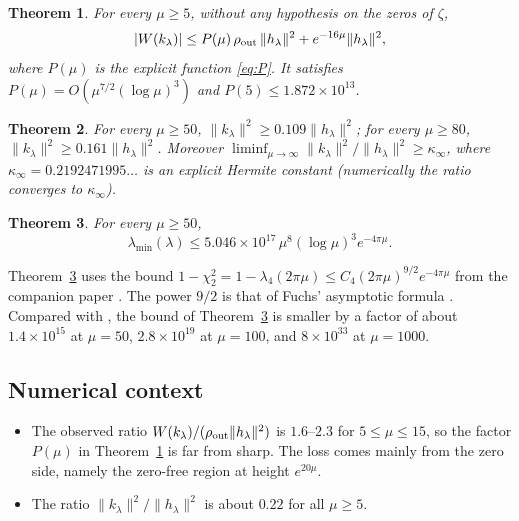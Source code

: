 \documentclass[11pt]{amsart}
\newtheorem{theorem}{Theorem}
\theoremstyle{remark}
\numberwithin{equation}{section}
\begin{document}
\begin{theorem}\label{thm:C}
For every $\mu\ge5$, without any hypothesis on the zeros of $\zeta$,
\[
|W(k_\lambda)|\le P(\mu)\,\rho_{\rm out}\,\|h_\lambda\|^2+e^{-16\mu}\|h_\lambda\|^2,
\]
where $P(\mu)$ is the explicit function \eqref{eq:P}. It satisfies $P(\mu)=O(\mu^{7/2}(\log\mu)^3)$ and $P(5)\le1.872\times10^{13}$.
\end{theorem}

\begin{theorem}\label{thm:L6}
For every $\mu\ge50$, $\|k_\lambda\|^2\ge0.109\|h_\lambda\|^2$; for every $\mu\ge80$, $\|k_\lambda\|^2\ge0.161\|h_\lambda\|^2$. Moreover $\liminf_{\mu\to\infty}\|k_\lambda\|^2/\|h_\lambda\|^2\ge\kappa_\infty$, where $\kappa_\infty=0.2192471995\ldots$ is an explicit Hermite constant (numerically the ratio converges to $\kappa_\infty$).
\end{theorem}

\begin{theorem}\label{thm:E}
For every $\mu\ge50$,
\[
\lambda_{\min}(\lambda)\le5.046\times10^{17}\,\mu^8(\log\mu)^3e^{-4\pi\mu}.
\]
\end{theorem}

Theorem~\ref{thm:E} uses the bound $1-\chi_2^2=1-\lambda_4(2\pi\mu)\le C_4(2\pi\mu)^{9/2}e^{-4\pi\mu}$ from the companion paper \cite{MoriPSWF}. The power $9/2$ is that of Fuchs' asymptotic formula \cite{Fuchs64}. Compared with \cite[Thm.~B]{MoriWWUB}, the bound of Theorem~\ref{thm:E} is smaller by a factor of about $1.4\times10^{15}$ at $\mu=50$, $2.8\times10^{19}$ at $\mu=100$, and $8\times10^{33}$ at $\mu=1000$.

\subsection{Numerical context}
\begin{itemize}
\item The observed ratio $W(k_\lambda)/(\rho_{\rm out}\|h_\lambda\|^2)$ is $1.6$--$2.3$ for $5\le\mu\le15$, so the factor $P(\mu)$ in Theorem~\ref{thm:C} is far from sharp. The loss comes mainly from the zero side, namely the zero-free region at height $e^{20\mu}$.
\item The ratio $\|k_\lambda\|^2/\|h_\lambda\|^2$ is about $0.22$ for all $\mu\ge5$.
\end{itemize}
\end{document}
